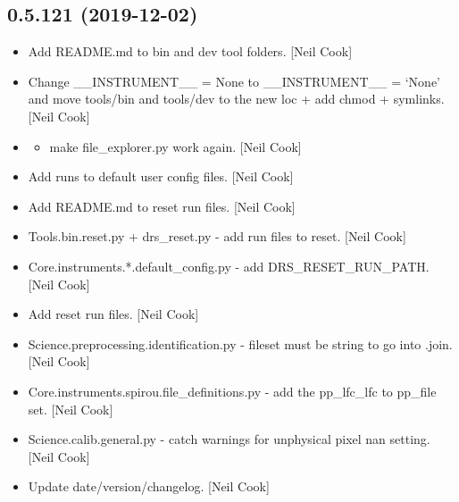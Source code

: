 \documentclass[a4paper,10pt,english]{report}
\begin{document}
\subsection{0.5.121 (2019-12-02)}
\label{\detokenize{misc/changelog:id20}}\begin{itemize}
\item {} 
Add README.md to bin and dev tool folders. {[}Neil Cook{]}

\item {} 
Change \_\_INSTRUMENT\_\_ = None to \_\_INSTRUMENT\_\_ = ‘None’ and move
tools/bin and tools/dev to the new loc + add chmod + symlinks. {[}Neil
Cook{]}

\item {} \begin{itemize}
\item {} 
make file\_explorer.py work again. {[}Neil Cook{]}

\end{itemize}

\item {} 
Add runs to default user config files. {[}Neil Cook{]}

\item {} 
Add README.md to reset run files. {[}Neil Cook{]}

\item {} 
Tools.bin.reset.py + drs\_reset.py - add run files to reset. {[}Neil
Cook{]}

\item {} 
Core.instruments.*.default\_config.py - add DRS\_RESET\_RUN\_PATH. {[}Neil
Cook{]}

\item {} 
Add reset run files. {[}Neil Cook{]}

\item {} 
Science.preprocessing.identification.py - fileset must be string to go
into .join. {[}Neil Cook{]}

\item {} 
Core.instruments.spirou.file\_definitions.py - add the pp\_lfc\_lfc to
pp\_file set. {[}Neil Cook{]}

\item {} 
Science.calib.general.py - catch warnings for unphysical pixel nan
setting. {[}Neil Cook{]}

\item {} 
Update date/version/changelog. {[}Neil Cook{]}

\end{itemize}
\end{document}
